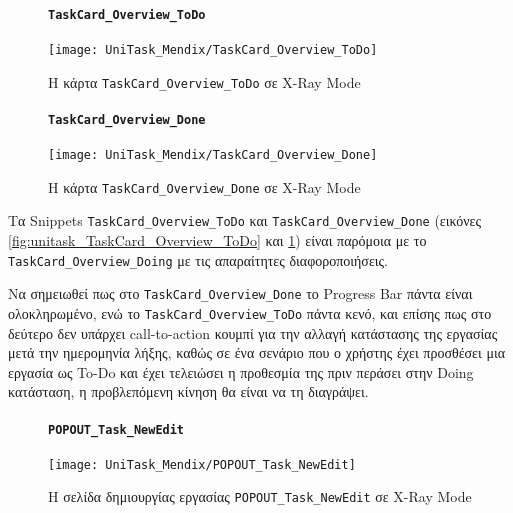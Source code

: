                 \begin{figure}[H] \noindent
                    \paragraph{\texttt{TaskCard\_Overview\_ToDo}}
                    \begin{center}
                        \texttt{[image: UniTask\_Mendix/TaskCard\_Overview\_ToDo]}
                        \caption{\centering Η κάρτα \texttt{TaskCard\_Overview\_ToDo} σε X-Ray Mode}
                        \label{fig:unitask_TaskCard_Overview_ToDo}
                    \end{center}

                    \paragraph{\texttt{TaskCard\_Overview\_Done}}
                    \begin{center}
                        \texttt{[image: UniTask\_Mendix/TaskCard\_Overview\_Done]}
                        \caption{\centering Η κάρτα \texttt{TaskCard\_Overview\_Done} σε X-Ray Mode}
                        \label{fig:unitask_TaskCard_Overview_Done}
                    \end{center}
                \end{figure}

                Τα Snippets \texttt{TaskCard\_Overview\_ToDo} και \texttt{TaskCard\_Overview\_Done} (εικόνες \ref{fig:unitask_TaskCard_Overview_ToDo} και \ref{fig:unitask_TaskCard_Overview_Done}) είναι παρόμοια με το \texttt{TaskCard\_Overview\_Doing} με τις απαραίτητες διαφοροποιήσεις.

                Να σημειωθεί πως στο \texttt{TaskCard\_Overview\_Done} το Progress Bar πάντα είναι ολοκληρωμένο, ενώ το \texttt{TaskCard\_Overview\_ToDo} πάντα κενό, και επίσης πως στο δεύτερο δεν υπάρχει call-to-action κουμπί για την αλλαγή κατάστασης της εργασίας μετά την ημερομηνία λήξης, καθώς σε ένα σενάριο που ο χρήστης έχει προσθέσει μια εργασία ως To-Do και έχει τελειώσει η προθεσμία της πριν περάσει στην Doing κατάσταση, η προβλεπόμενη κίνηση θα είναι να τη διαγράψει.

                \begin{figure}[H] \noindent
                    \paragraph{\texttt{POPOUT\_Task\_NewEdit}}
                    \begin{center}
                        \texttt{[image: UniTask\_Mendix/POPOUT\_Task\_NewEdit]}
                        \caption{\centering Η σελίδα δημιουργίας εργασίας \texttt{POPOUT\_Task\_NewEdit} σε X-Ray Mode}
                        \label{fig:unitask_POPOUT_Task_NewEdit}
                    \end{center}
                \end{figure}

